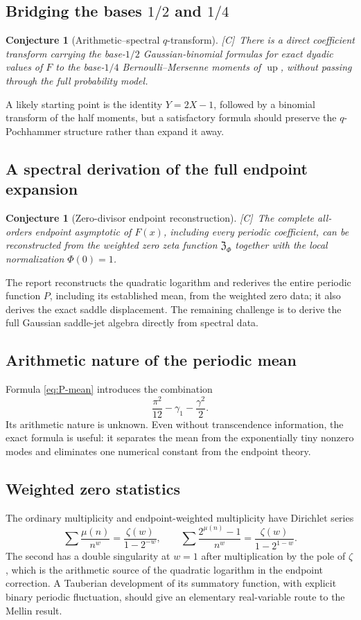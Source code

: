 \documentclass[11pt,oneside]{article}
\newtheorem{conjecture}[theorem]{Conjecture}
\theoremstyle{definition}
\theoremstyle{remark}
\newcommand{\Up}{\operatorname{up}}
\newcommand{\statusC}{\textsf{[C]}}
\begin{document}
\subsection{Bridging the bases $1/2$ and $1/4$}
\begin{conjecture}[Arithmetic--spectral $q$-transform]
\statusC\ There is a direct coefficient transform carrying the base-$1/2$ Gaussian-binomial
formulas for exact dyadic values of $F$ to the base-$1/4$ Bernoulli--Mersenne moments of
$\Up$, without passing through the full probability model.
\end{conjecture}
A likely starting point is the identity $Y=2X-1$, followed by a binomial transform of the
half moments, but a satisfactory formula should preserve the $q$-Pochhammer structure
rather than expand it away.

\subsection{A spectral derivation of the full endpoint expansion}
\begin{conjecture}[Zero-divisor endpoint reconstruction]
\statusC\ The complete all-orders endpoint asymptotic of $F(x)$, including every periodic
coefficient, can be reconstructed from the weighted zero zeta function
$\mathfrak Z_\Phi$ together with the local normalization $\Phi(0)=1$.
\end{conjecture}
The report reconstructs the quadratic logarithm and rederives the entire periodic function
$P$, including its established mean, from the weighted zero data; it also derives the exact
saddle displacement.  The remaining challenge is to derive the full
Gaussian saddle-jet algebra directly from spectral data.

\subsection{Arithmetic nature of the periodic mean}
Formula \eqref{eq:P-mean} introduces the combination
\[
 \frac{\pi^2}{12}-\gamma_1-\frac{\gamma^2}{2}.
\]
Its arithmetic nature is unknown.  Even without transcendence information, the exact
formula is useful: it separates the mean from the exponentially tiny nonzero modes and
eliminates one numerical constant from the endpoint theory.

\subsection{Weighted zero statistics}
The ordinary multiplicity and endpoint-weighted multiplicity have Dirichlet series
\[
 \sum\frac{\mu(n)}{n^w}=\frac{\zeta(w)}{1-2^{-w}},
 \qquad
 \sum\frac{2^{\mu(n)}-1}{n^w}=\frac{\zeta(w)}{1-2^{1-w}}.
\]
The second has a double singularity at $w=1$ after multiplication by the pole of $\zeta$,
which is the arithmetic source of the quadratic logarithm in the endpoint correction.
A Tauberian development of its summatory function, with explicit binary periodic
fluctuation, should give an elementary real-variable route to the Mellin result.
\end{document}
